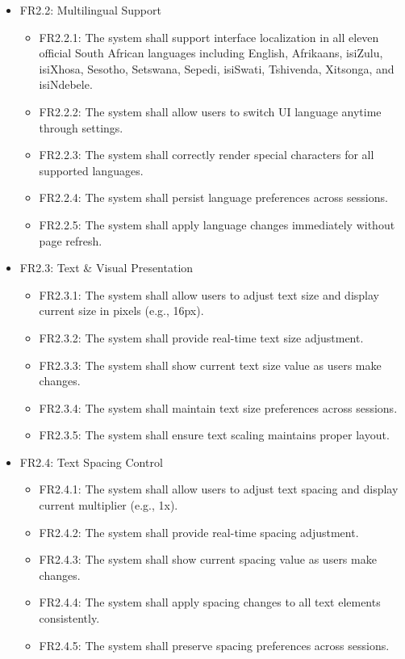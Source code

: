 \documentclass[12pt]{article}
\begin{document}
\begin{enumerate}[label=FR\arabic*:, leftmargin=2.5em]
\begin{itemize}
        \item FR2.2: Multilingual Support
        \begin{itemize}
            \item FR2.2.1: The system shall support interface localization in all eleven official South African languages including English, Afrikaans, isiZulu, isiXhosa, Sesotho, Setswana, Sepedi, isiSwati, Tshivenda, Xitsonga, and isiNdebele.
            \item FR2.2.2: The system shall allow users to switch UI language anytime through settings.
            \item FR2.2.3: The system shall correctly render special characters for all supported languages.
            \item FR2.2.4: The system shall persist language preferences across sessions.
            \item FR2.2.5: The system shall apply language changes immediately without page refresh.
        \end{itemize}
        
        \item FR2.3: Text \& Visual Presentation
        \begin{itemize}
            \item FR2.3.1: The system shall allow users to adjust text size and display current size in pixels (e.g., 16px).
            \item FR2.3.2: The system shall provide real-time text size adjustment.
            \item FR2.3.3: The system shall show current text size value as users make changes.
            \item FR2.3.4: The system shall maintain text size preferences across sessions.
            \item FR2.3.5: The system shall ensure text scaling maintains proper layout.
        \end{itemize}
        
        \item FR2.4: Text Spacing Control
        \begin{itemize}
            \item FR2.4.1: The system shall allow users to adjust text spacing and display current multiplier (e.g., 1x).
            \item FR2.4.2: The system shall provide real-time spacing adjustment.
            \item FR2.4.3: The system shall show current spacing value as users make changes.
            \item FR2.4.4: The system shall apply spacing changes to all text elements consistently.
            \item FR2.4.5: The system shall preserve spacing preferences across sessions.
        \end{itemize}
        

\end{itemize}
\end{enumerate}
\end{document}
